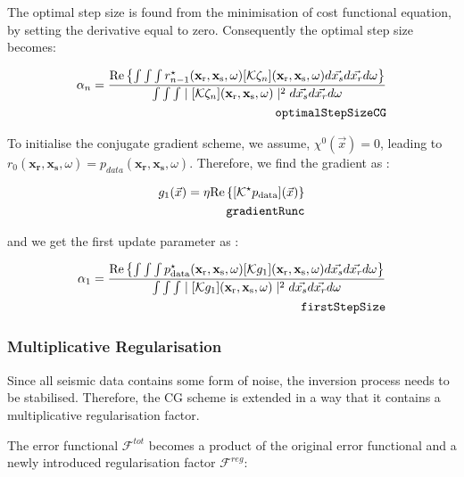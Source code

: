 \documentclass[10pt,a4paper]{article}
\newcommand{\real}[1]{\text{Re} \left\{ #1 \right\}}
\begin{document}
The optimal step size is found from the minimisation of cost
functional equation, by setting the derivative equal to zero.
Consequently the optimal step size becomes:

\begin{align} \label{eq:optimalStepSizeCG} \alpha_n = \frac {\real {\int \int
\int r^{\star}_{n-1}(\mathbf{x_\text{r}},\mathbf{x_\text{s}},\omega)[\mathcal{K}
\zeta_n](\mathbf{x_\text{r}},\mathbf{x_\text{s}},\omega)d\vec{x_s}d\vec{x_r}d\omega}}{\int
\int \int \mid[\mathcal{K}
\zeta_n](\mathbf{x_\text{r}},\mathbf{x_\text{s}},\omega) \mid^2
d\vec{x_s}d\vec{x_r}d\omega}\\
\tag*{\texttt{optimalStepSizeCG}}
\end{align}

To initialise the conjugate gradient scheme, we assume, $\chi^0
(\vec{x}) = 0$, leading to
$r_0(\mathbf{x_\text{r}},\mathbf{x_\text{s}},\omega) =
p_{data}(\mathbf{x_\text{r}},\mathbf{x_\text{s}},\omega)$.
Therefore, we find the gradient as :

\begin{align} \label{eq:gradientFunc} g_1(\vec{x}) = \eta
\real{[\mathcal{K}^\star p_\text{data}](\vec{x})}\\
\tag*{\texttt{gradientRunc}}
\end{align}

and we get the first update parameter as :

\begin{align} \label{eq:firstStepSize} \alpha_1 = \frac {\real {\int \int
\int p^{\star}_\text{data}(\mathbf{x_\text{r}},\mathbf{x_\text{s}},\omega)[\mathcal{K}
g_1](\mathbf{x_\text{r}},\mathbf{x_\text{s}},\omega)d\vec{x_s}d\vec{x_r}d\omega}}{\int
\int \int \mid[\mathcal{K}
g_1](\mathbf{x_\text{r}},\mathbf{x_\text{s}},\omega) \mid^2
d\vec{x_s}d\vec{x_r}d\omega}\\
\tag*{\texttt{firstStepSize}}
\end{align}


\subsubsection{Multiplicative Regularisation}
\label{multreg}
Since all seismic data contains some form of noise, the inversion
process needs to be stabilised. Therefore, the CG scheme is extended
in a way that it contains a multiplicative regularisation factor.

The error functional $\mathcal{F}^{tot}$ becomes a product of the
original error functional and a newly introduced regularisation factor
$\mathcal{F}^{reg}$:
\end{document}
